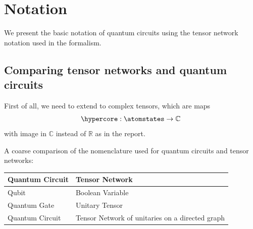 \section{Notation}

We present the basic notation of quantum circuits using the tensor network notation used in the \tnreason{} formalism.

\subsection{Comparing tensor networks and quantum circuits}

First of all, we need to extend to complex tensors, which are maps
\begin{align*}
    \hypercore : \atomstates \rightarrow \mathbb{C} \,
\end{align*}
with image in $\mathbb{C}$ instead of $\mathbb{R}$ as in the report.

A coarse comparison of the nomenclature used for quantum circuits and tensor networks:

\begin{center}
    \begin{tabular}{l|l}
        \textbf{Quantum Circuit} & \textbf{Tensor Network}                         \\
        \hline
        Qubit                    & Boolean Variable                                \\
        Quantum Gate             & Unitary Tensor                                  \\
        Quantum Circuit          & Tensor Network of unitaries on a directed graph
    \end{tabular}
\end{center}

